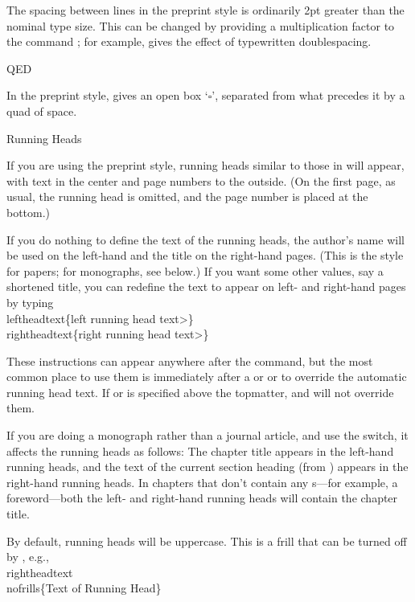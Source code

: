 The spacing between lines in the preprint style is ordinarily 2pt greater
than the nominal type size.  This can be changed by providing a multiplication
factor to the command ; for example, 
gives the effect of typewritten doublespacing.


\subhead QED \endsubhead

In the preprint style,  gives an open box `$\square$',
separated from what precedes it by a quad of space.


\subhead Running Heads \endsubhead

If you are using the preprint style, running heads similar to those in
\Joy{} will appear, with text in the center and page numbers to the
outside.  (On the first page, as usual, the running head is omitted, and
the page number is placed at the bottom.)

If you do nothing to define the text of the running heads, the author's
name will be used on the left-hand and the title on the right-hand pages.
(This is the style for papers; for monographs, see below.)
If you want some other values, say a shortened title, you
can redefine the text to appear on left- and right-hand pages by typing
\beginexample{}
\\leftheadtext\{\<left running head text>\}
\\rightheadtext\{\<right running head text>\}
\endexample

\noindent These instructions can appear anywhere after the
 command, but the most
common place to use them is immediately after a  or
 or  to override the automatic running head text.
If  or  is specified above the
topmatter,  and  will not override them.

If you are doing a monograph rather than a journal article, and use
the  switch, it affects the running heads as follows:
The chapter title appears in the left-hand running heads, and the text of
the current section heading (from ) appears in the right-hand
running heads.  In chapters that don't contain any s---for
example, a foreword---both the left- and right-hand running heads
will contain the chapter title.

By default, running heads will be uppercase.  This is a frill that
can be turned off by , e.g.,
\beginexample{}
\\rightheadtext\\nofrills\{Text of Running Head\}
\endexample

